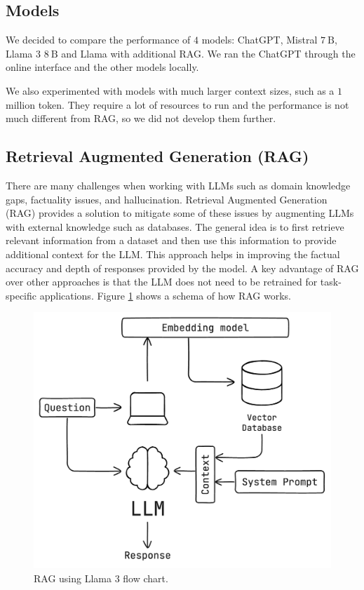 \documentclass[fleqn,moreauthors,10pt]{ds_report}
\begin{document}
\subsection*{Models}

We decided to compare the performance of $4$ models: ChatGPT, Mistral
$7\ \mathrm{B}$, Llama 3 $8\ \mathrm{B}$ and Llama with additional RAG.
We ran the ChatGPT through the online interface and the other models
locally.

\pagebreak
We also experimented with models with much larger context sizes,
such as a $1$ million token. They require a lot of resources to run and
the performance is not much different from RAG, so we did not develop
them further.

\subsection*{Retrieval Augmented Generation (RAG)}
There are many challenges when working with LLMs such as domain knowledge gaps, factuality issues, and hallucination. Retrieval Augmented Generation (RAG) \cite{rag} provides a solution to mitigate some of these issues by augmenting LLMs with external knowledge such as databases. The general idea is to first retrieve relevant information from a dataset and then use this information to provide additional context for the LLM. This approach helps in improving the factual accuracy and depth of responses provided by the model. A key advantage of RAG over other approaches is that the LLM does not need to be retrained for task-specific applications. Figure \ref{fig:rag} shows a schema of how RAG works.

\begin{figure}[h]
    \centering
    \includegraphics[width=0.9\linewidth]{flow_chart.png}
    \caption{RAG using Llama 3 flow chart.}
    \label{fig:rag}
\end{figure}
\end{document}
